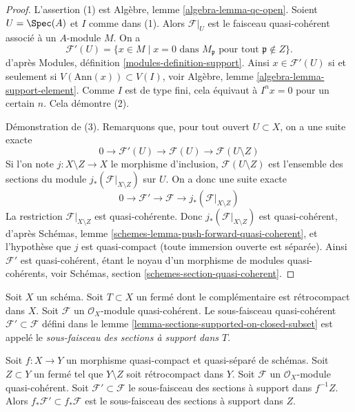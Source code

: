 \begin{proof}
L'assertion (1) est Algèbre, lemme \ref{algebra-lemma-qc-open}.
Soient $U = \Spec(A)$ et $I$ comme dans (1).
Alors $\mathcal{F}|_U$ est le faisceau quasi-cohérent associé
à un $A$-module $M$. On a
$$
\mathcal{F}'(U) = \{x \in M \mid x = 0\text{ dans }M_\mathfrak p
\text{ pour tout }\mathfrak p \not \in Z\}.
$$
d'après Modules, définition \ref{modules-definition-support}. Ainsi
$x \in \mathcal{F}'(U)$ si et seulement si $V(\text{Ann}(x)) \subset V(I)$, voir
Algèbre, lemme \ref{algebra-lemma-support-element}. Comme $I$ est
de type fini, cela équivaut à $I^n x = 0$ pour un certain $n$.
Cela démontre (2).

\medskip\noindent
Démonstration de (3). Remarquons que, pour tout ouvert $U \subset X$, on a une suite exacte
$$
0 \to \mathcal{F}'(U) \to \mathcal{F}(U) \to \mathcal{F}(U \setminus Z)
$$
Si l'on note $j : X \setminus Z \to X$ le morphisme d'inclusion,
$\mathcal{F}(U \setminus Z)$ est l'ensemble des sections du
module $j_*(\mathcal{F}|_{X \setminus Z})$ sur $U$. On a donc
une suite exacte
$$
0 \to \mathcal{F}' \to \mathcal{F} \to j_*(\mathcal{F}|_{X \setminus Z})
$$
La restriction $\mathcal{F}|_{X \setminus Z}$ est quasi-cohérente.
Donc $j_*(\mathcal{F}|_{X \setminus Z})$ est quasi-cohérent,
d'après Schémas, lemme \ref{schemes-lemma-push-forward-quasi-coherent},
et l'hypothèse que $j$ est quasi-compact (toute immersion ouverte
est séparée). Ainsi $\mathcal{F}'$ est quasi-cohérent,
étant le noyau d'un morphisme de modules quasi-cohérents, voir
Schémas, section \ref{schemes-section-quasi-coherent}.
\end{proof}

\begin{definition}
\label{definition-subsheaf-sections-supported-on-closed}
Soit $X$ un schéma.
Soit $T \subset X$ un fermé dont le complémentaire
est rétrocompact dans $X$.
Soit $\mathcal{F}$ un $\mathcal{O}_X$-module quasi-cohérent.
Le sous-faisceau quasi-cohérent $\mathcal{F}' \subset \mathcal{F}$ défini dans le
lemme \ref{lemma-sections-supported-on-closed-subset} est appelé
le {\it sous-faisceau des sections à support dans $T$}.
\end{definition}

\begin{lemma}
\label{lemma-push-sections-supported-on-closed-subset}
Soit $f : X \to Y$ un morphisme quasi-compact et quasi-séparé
de schémas. Soit $Z \subset Y$ un fermé tel que
$Y \setminus Z$ soit rétrocompact dans $Y$. Soit $\mathcal{F}$ un
$\mathcal{O}_X$-module quasi-cohérent. Soit $\mathcal{F}' \subset \mathcal{F}$
le sous-faisceau des sections à support dans $f^{-1}Z$.
Alors $f_*\mathcal{F}' \subset f_*\mathcal{F}$ est le sous-faisceau
des sections à support dans $Z$.
\end{lemma}

